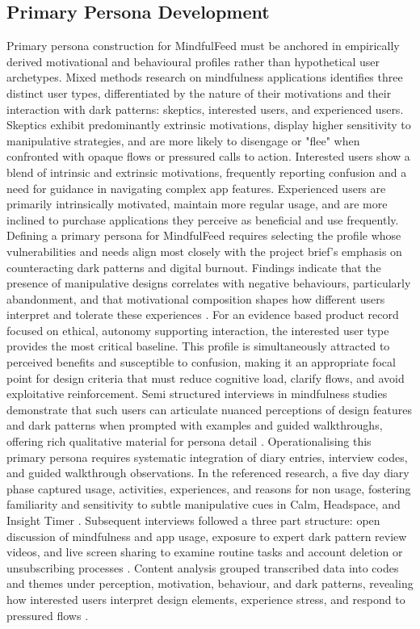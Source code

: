 \documentclass{article}
\begin{document}
\subsection{Primary Persona Development}
\label{sec:primary_persona_development} Primary persona construction for MindfulFeed must be anchored in empirically derived motivational and behavioural profiles rather than hypothetical user archetypes. Mixed methods research on mindfulness applications identifies three distinct user types, differentiated by the nature of their motivations and their interaction with dark patterns: skeptics, interested users, and experienced users. Skeptics exhibit predominantly extrinsic motivations, display higher sensitivity to manipulative strategies, and are more likely to disengage or "flee" when confronted with opaque flows or pressured calls to action. Interested users show a blend of intrinsic and extrinsic motivations, frequently reporting confusion and a need for guidance in navigating complex app features. Experienced users are primarily intrinsically motivated, maintain more regular usage, and are more inclined to purchase applications they perceive as beneficial and use frequently. Defining a primary persona for MindfulFeed requires selecting the profile whose vulnerabilities and needs align most closely with the project brief's emphasis on counteracting dark patterns and digital burnout. Findings indicate that the presence of manipulative designs correlates with negative behaviours, particularly abandonment, and that motivational composition shapes how different users interpret and tolerate these experiences \parencites[5]{7173856}. For an evidence based product record focused on ethical, autonomy supporting interaction, the interested user type provides the most critical baseline. This profile is simultaneously attracted to perceived benefits and susceptible to confusion, making it an appropriate focal point for design criteria that must reduce cognitive load, clarify flows, and avoid exploitative reinforcement. Semi structured interviews in mindfulness studies demonstrate that such users can articulate nuanced perceptions of design features and dark patterns when prompted with examples and guided walkthroughs, offering rich qualitative material for persona detail \parencites[2]{7173856}[5]{7173856}. Operationalising this primary persona requires systematic integration of diary entries, interview codes, and guided walkthrough observations. In the referenced research, a five day diary phase captured usage, activities, experiences, and reasons for non usage, fostering familiarity and sensitivity to subtle manipulative cues in Calm, Headspace, and Insight Timer \parencites[7173856][4]{7173856}. Subsequent interviews followed a three part structure: open discussion of mindfulness and app usage, exposure to expert dark pattern review videos, and live screen sharing to examine routine tasks and account deletion or unsubscribing processes \parencites[2]{7173856}[4]{7173856}. Content analysis grouped transcribed data into codes and themes under perception, motivation, behaviour, and dark patterns, revealing how interested users interpret design elements, experience stress, and respond to pressured flows \parencites[7173856][5]{7173856}. 
\end{document}
